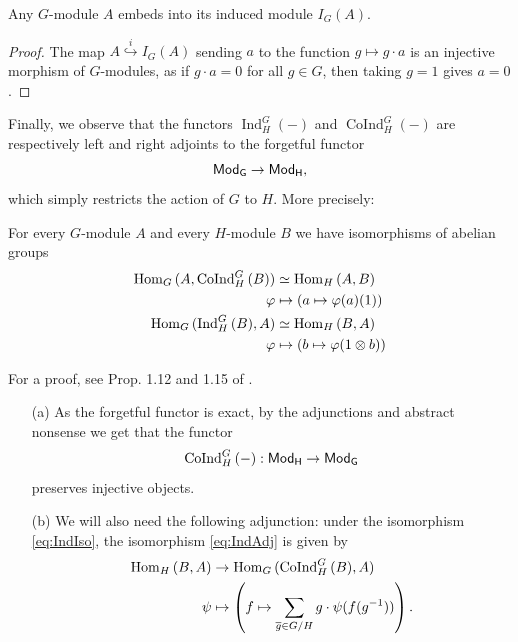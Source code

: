 \documentclass[a4paper, oneside]{memoir}
\begin{document}
\begin{proposition}
    Any $G$-module $A$ embeds into its induced module $I_G(A)$.
\end{proposition}

\begin{proof}
    The map $A\overset{i}{\hookrightarrow} I_G(A)$ sending $a$ to the function $g\mapsto g\cdot a$ is an injective morphism of $G$-modules, as if $g\cdot a = 0 $ for all $g\in G$, then taking $g=1$ gives $a=0$.
\end{proof}

\noindent Finally, we observe that the functors $\operatorname{Ind}^G_H{(-)}$ and $\operatorname{CoInd}^G_H{(-)}$ are respectively left and right adjoints to the forgetful functor
\[
    \mathsf{Mod}_\mathsf{G}\to\mathsf{Mod}_\mathsf{H},
\]
which simply restricts the action of $G$ to $H$. More precisely:

\begin{proposition}
    For every $G$-module $A$ and every $H$-module $B$ we have isomorphisms of abelian groups
    \begin{align}
        \operatorname{Hom}_G{(A,\operatorname{CoInd}^G_H{(B)})} & \simeq \operatorname{Hom}_H{(A,B)}\label{eq:CoIndAdj}                    \\
        \varphi                                   & \mapsto (a\mapsto \varphi(a)(1)) \nonumber                 \\
        \operatorname{Hom}_G{(\operatorname{Ind}^G_H{(B)},A)}   & \simeq \operatorname{Hom}_H{(B,A)}\label{eq:IndAdj}                      \\
        \varphi                                   & \mapsto \left(b\mapsto \varphi(1\otimes b)\right)\nonumber
    \end{align}
\end{proposition}
\noindent For a proof, see Prop. 1.12 and 1.15 of \cite{Harari}.

\begin{remark}\label{rm:Adj}
    \begin{itemize}
        \item[(a)] As the forgetful functor is exact, by the adjunctions and abstract nonsense we get that the functor
              \[
                  \operatorname{CoInd}^G_H{(-)}:\mathsf{Mod}_\mathsf{H}\to\mathsf{Mod}_\mathsf{G}
              \]
              preserves injective objects.
        \item[(b)] We will also need the following adjunction: under the isomorphism \eqref{eq:IndIso}, the isomorphism \eqref{eq:IndAdj} is given by
              \begin{align*}
                  \operatorname{Hom}_H{(B,A)} & \to \operatorname{Hom}_G{(\operatorname{CoInd}^G_H{(B)},A)}                                        \\
                  \psi          & \mapsto \left(f\mapsto \sum_{\overline{g} \in G / H}{g\cdot \psi(f(g^{-1}))}\right).
              \end{align*}
    \end{itemize}
\end{remark}
\end{document}
